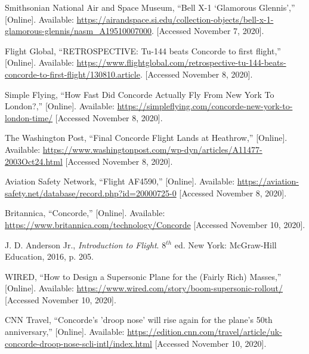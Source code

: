\documentclass[a4paper,11pt]{article}
\begin{document}

\renewcommand{\bibname}{\begin{huge}References\end{huge}}
\begin{thebibliography}


{Smithsonian National Air and Space Museum},
{``Bell X-1 `Glamorous Glennis',''}
[Online]. Available:
\url{https://airandspace.si.edu/collection-objects/bell-x-1-glamorous-glennis/nasm_A19510007000}.
[Accessed November 7, 2020].

{Flight Global},
{``RETROSPECTIVE: Tu-144 beats Concorde to first flight,''}
[Online]. Available:
\url{https://www.flightglobal.com/retrospective-tu-144-beats-concorde-to-first-flight/130810.article}.
[Accessed November 8, 2020].

{Simple Flying},
{``How Fast Did Concorde Actually Fly From New York To London?,''}
[Online]. Available:
\url{https://simpleflying.com/concorde-new-york-to-london-time/}
[Accessed November 8, 2020].

{The Washington Post},
{``Final Concorde Flight Lands at Heathrow,''}
[Online]. Available:
\url{https://www.washingtonpost.com/wp-dyn/articles/A11477-2003Oct24.html}
[Accessed November 8, 2020].

{Aviation Safety Network},
{``Flight AF4590,''}
[Online]. Available:
\url{https://aviation-safety.net/database/record.php?id=20000725-0}
[Accessed November 8, 2020].

{Britannica},
{``Concorde,''}
[Online]. Available:
\url{https://www.britannica.com/technology/Concorde}
[Accessed November 10, 2020].

{J. D. Anderson Jr.},
\textit{Introduction to Flight}.
{8$^{th}$ ed. New York: McGraw-Hill Education, 2016, p. 205}.

{WIRED},
{``How to Design a Supersonic Plane for the (Fairly Rich) Masses,''}
[Online]. Available:
\url{https://www.wired.com/story/boom-supersonic-rollout/}
[Accessed November 10, 2020].

{CNN Travel},
{``Concorde's 'droop nose' will rise again for the plane's 50th anniversary,''}
[Online]. Available:
\url{https://edition.cnn.com/travel/article/uk-concorde-droop-nose-scli-intl/index.html}
[Accessed November 10, 2020].


\end{thebibliography}
\end{document}
